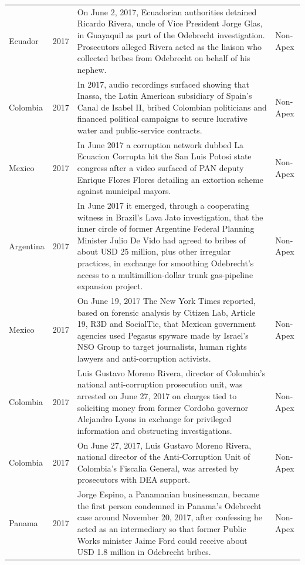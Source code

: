 \begin{landscape}
\begin{longtable}{@{}l c p{15.5cm} l@{}}
Ecuador & 2017 & On June 2, 2017, Ecuadorian authorities detained Ricardo Rivera, uncle of Vice President Jorge Glas, in Guayaquil as part of the Odebrecht investigation. Prosecutors alleged Rivera acted as the liaison who collected bribes from Odebrecht on behalf of his nephew. & Non-Apex \\
Colombia & 2017 & In 2017, audio recordings surfaced showing that Inassa, the Latin American subsidiary of Spain's Canal de Isabel II, bribed Colombian politicians and financed political campaigns to secure lucrative water and public-service contracts. & Non-Apex \\
Mexico & 2017 & In June 2017 a corruption network dubbed La Ecuacion Corrupta hit the San Luis Potosi state congress after a video surfaced of PAN deputy Enrique Flores Flores detailing an extortion scheme against municipal mayors. & Non-Apex \\
Argentina & 2017 & In June 2017 it emerged, through a cooperating witness in Brazil's Lava Jato investigation, that the inner circle of former Argentine Federal Planning Minister Julio De Vido had agreed to bribes of about USD 25 million, plus other irregular practices, in exchange for smoothing Odebrecht's access to a multimillion-dollar trunk gas-pipeline expansion project. & Non-Apex \\
Mexico & 2017 & On June 19, 2017 The New York Times reported, based on forensic analysis by Citizen Lab, Article 19, R3D and SocialTic, that Mexican government agencies used Pegasus spyware made by Israel's NSO Group to target journalists, human rights lawyers and anti-corruption activists. & Non-Apex \\
Colombia & 2017 & Luis Gustavo Moreno Rivera, director of Colombia's national anti-corruption prosecution unit, was arrested on June 27, 2017 on charges tied to soliciting money from former Cordoba governor Alejandro Lyons in exchange for privileged information and obstructing investigations. & Non-Apex \\
Colombia & 2017 & On June 27, 2017, Luis Gustavo Moreno Rivera, national director of the Anti-Corruption Unit of Colombia's Fiscalia General, was arrested by prosecutors with DEA support. & Non-Apex \\
Panama & 2017 & Jorge Espino, a Panamanian businessman, became the first person condemned in Panama's Odebrecht case around November 20, 2017, after confessing he acted as an intermediary so that former Public Works minister Jaime Ford could receive about USD 1.8 million in Odebrecht bribes. & Non-Apex \\

\end{longtable}
\end{landscape}

